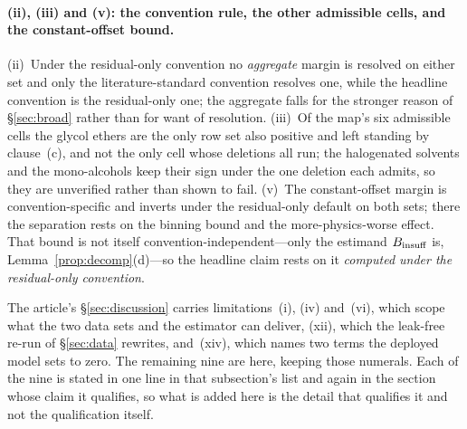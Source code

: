 \paragraph{(ii), (iii) and (v): the convention rule, the other admissible cells, and the
constant-offset bound.}
(ii)~Under the residual-only convention no \emph{aggregate} margin is resolved on either set and only the
literature-standard convention resolves one, while the headline convention is the residual-only one; the
aggregate falls for the stronger reason of \S\ref{sec:broad} rather than for want of resolution.
(iii)~Of the map's six admissible cells the glycol ethers are the only row set also positive and
left standing by clause~(c), and not the only cell whose deletions all run; the halogenated solvents
and the mono-alcohols keep their sign under the one deletion each admits, so they are unverified
rather than shown to fail.
(v)~The constant-offset margin is
convention-specific and inverts under the residual-only default on both sets; there the separation rests
on the binning bound and the more-physics-worse effect. That bound is not itself
convention-independent---only the estimand $B_{\mathrm{insuff}}$ is, Lemma~\ref{prop:decomp}(d)---so the headline
claim rests on it \emph{computed under the residual-only convention}.

The article's \S\ref{sec:discussion} carries limitations~(i), (iv) and~(vi), which scope what the two
data sets and the estimator can deliver, (xii), which the leak-free re-run of \S\ref{sec:data}
rewrites, and~(xiv), which names two terms the deployed model sets to zero. The remaining nine are
here, keeping those numerals. Each of the nine is stated in one line in that
subsection's list and again in the section whose claim it qualifies, so
what is added here is the detail that qualifies it and not the qualification itself.

